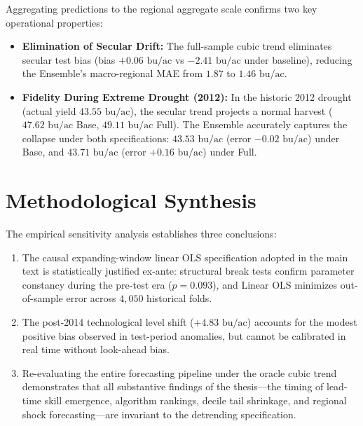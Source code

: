 Aggregating predictions to the regional aggregate scale confirms two key operational properties:
\begin{itemize}
    \item \textbf{Elimination of Secular Drift:} The full-sample cubic trend eliminates secular test bias (bias $+0.06\text{ bu/ac}$ vs $-2.41\text{ bu/ac}$ under baseline), reducing the Ensemble's macro-regional MAE from $1.87$ to $\boldsymbol{1.46}\text{ bu/ac}$.
    \item \textbf{Fidelity During Extreme Drought (2012):} In the historic 2012 drought (actual yield $43.55\text{ bu/ac}$), the secular trend projects a normal harvest ($47.62\text{ bu/ac}$ Base, $49.11\text{ bu/ac}$ Full). The Ensemble accurately captures the collapse under both specifications: $\boldsymbol{43.53}\text{ bu/ac}$ (error $-0.02\text{ bu/ac}$) under Base, and $\boldsymbol{43.71}\text{ bu/ac}$ (error $+0.16\text{ bu/ac}$) under Full.
\end{itemize}


\section{Methodological Synthesis}
\label{sec:app_synthesis}

The empirical sensitivity analysis establishes three conclusions:
\begin{enumerate}
    \item The causal expanding-window linear OLS specification adopted in the main text is statistically justified ex-ante: structural break tests confirm parameter constancy during the pre-test era ($p = 0.093$), and Linear OLS minimizes out-of-sample error across $4{,}050$ historical folds.
    \item The post-2014 technological level shift ($+4.83\text{ bu/ac}$) accounts for the modest positive bias observed in test-period anomalies, but cannot be calibrated in real time without look-ahead bias.
    \item Re-evaluating the entire forecasting pipeline under the oracle cubic trend demonstrates that all substantive findings of the thesis---the timing of lead-time skill emergence, algorithm rankings, decile tail shrinkage, and regional shock forecasting---are invariant to the detrending specification.
\end{enumerate}
